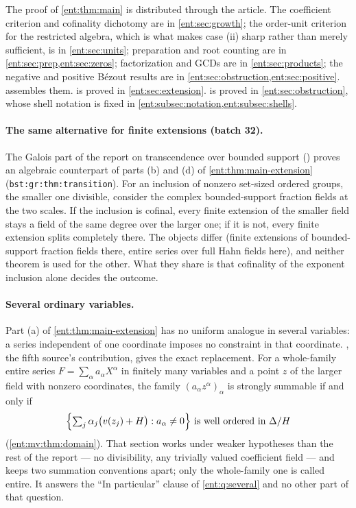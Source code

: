 \documentclass[11pt]{article}
\theoremstyle{plain}
\theoremstyle{plain}
\theoremstyle{plain}
\theoremstyle{definition}
\theoremstyle{definition}
\theoremstyle{definition}
\theoremstyle{definition}
\theoremstyle{remark}
\begin{document}
The proof of \cref{ent:thm:main} is distributed through the article. The
coefficient criterion and cofinality dichotomy are in
\cref{ent:sec:growth}; the order-unit criterion for the restricted algebra,
which is what makes case (ii) sharp rather than merely sufficient, is in
\cref{ent:sec:units}; preparation and root counting are in
\cref{ent:sec:prep,ent:sec:zeros}; factorization and GCDs are in
\cref{ent:sec:products}; the negative and positive B\'ezout results are in
\cref{ent:sec:obstruction,ent:sec:positive}.
 assembles them.
 is proved in \cref{ent:sec:extension}.
 is proved in \cref{ent:sec:obstruction}, whose
shell notation is fixed in \cref{ent:subsec:notation,ent:subsec:shells}.

\paragraph{The same alternative for finite extensions (batch 32).}
The Galois part of the report on transcendence over bounded support
() proves an algebraic
counterpart of parts (b) and (d) of \cref{ent:thm:main-extension}
(\texttt{bst:gr:thm:transition}). For an inclusion of nonzero set-sized
ordered groups, the smaller one divisible, consider the complex
bounded-support fraction fields at the two scales. If the inclusion is
cofinal, every finite extension of the smaller field stays a field of the
same degree over the larger one; if it is not, every finite extension
splits completely there. The objects differ (finite extensions of
bounded-support fraction fields there, entire series over full Hahn fields
here), and neither theorem is used for the other. What they share is that
cofinality of the exponent inclusion alone decides the outcome.

\paragraph{Several ordinary variables.}
Part (a) of \cref{ent:thm:main-extension} has no uniform analogue in
several variables: a series independent of one coordinate imposes no
constraint in that coordinate. , the fifth
source's contribution, gives the exact replacement. For a whole-family
entire series $F=\sum_\alpha a_\alpha X^\alpha$ in finitely many variables
and a point $z$ of the larger field with nonzero coordinates, the family
$(a_\alpha z^\alpha)_\alpha$ is strongly summable if and only if
\[
 \Bigl\{\textstyle\sum_j\alpha_j\bigl(v(z_j)+H\bigr):a_\alpha\ne0\Bigr\}
 \ \text{is well ordered in }\Delta/H
\]
(\cref{ent:mv:thm:domain}). That section works under weaker hypotheses than
the rest of the report --- no divisibility, any trivially valued coefficient
field --- and keeps two summation conventions apart; only the whole-family
one is called entire. It answers the ``In particular'' clause of
\cref{ent:q:several} and no other part of that question.
\end{document}
